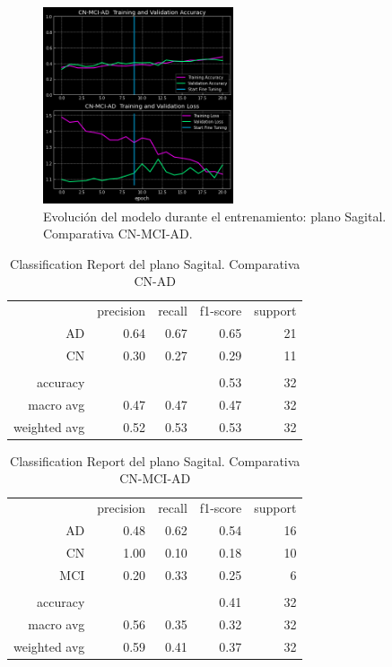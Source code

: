 \begin{figure}[H]
    \centering
    \includegraphics[width=0.5\textwidth]{./imgs/resultados/sagittal/CN_MCI_AD_output_SAGITTAL}
    \caption{Evolución del modelo durante el entrenamiento: plano Sagital. Comparativa CN-MCI-AD. }
    \label{fig:sagital-c-mci-ad}
\end{figure}

\begin{table}[H]
    \centering
    \begin{tabular}{r r r r r}
        & precision & recall & f1-score & support \\
        AD & 0.64 & 0.67 & 0.65 & 21 \\
        CN & 0.30 & 0.27 & 0.29 & 11 \\
        & & & & \\
        accuracy &  &  & 0.53 & 32 \\
        macro avg & 0.47 & 0.47 & 0.47 & 32 \\
        weighted avg & 0.52 & 0.53 & 0.53 & 32 \\
    \end{tabular}
    \caption{Classification Report del plano Sagital. Comparativa CN-AD}
    \label{tab:cr-sagital-cn-ad}
\end{table}

\begin{table}[H]
    \centering
    \begin{tabular}{r r r r r}
        & precision & recall & f1-score & support \\
        AD & 0.48 & 0.62 & 0.54 & 16 \\
        CN & 1.00 & 0.10 & 0.18 & 10 \\
        MCI & 0.20 & 0.33 & 0.25 & 6 \\
        & & & & \\
        accuracy &  &  & 0.41 & 32 \\
        macro avg & 0.56 & 0.35 & 0.32 & 32 \\
        weighted avg & 0.59 & 0.41 & 0.37 & 32 \\
    \end{tabular}
    \caption{Classification Report del plano Sagital. Comparativa CN-MCI-AD}
    \label{tab:cr-sagital-cn-mci-ad}
\end{table}

